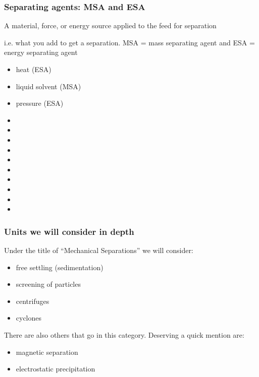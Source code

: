 \begin{frame}\frametitle{Separating agents: MSA and ESA}	
	\begin{exampleblock}
		{A material, force, or energy source applied to the feed for separation }
	\end{exampleblock}
	\vspace{12pt}
	i.e. what you add to get a separation. MSA = mass separating agent and ESA = energy separating agent
	\vspace{12pt}
	
	\begin{itemize}
		\item	heat (ESA)
		\item	liquid solvent (MSA)
		\item	pressure (ESA)
		\item	\pause\iftoggle{instructor}{vacuum}{}
		\item	\iftoggle{instructor}{membrane}{}
		\item	\iftoggle{instructor}{filter media}{}
		\item	\iftoggle{instructor}{electric field}{}
		\item	\iftoggle{instructor}{flow}{}
		\item	\iftoggle{instructor}{temperature gradient}{}
		\item	\iftoggle{instructor}{concentration gradient}{}
		\item	\iftoggle{instructor}{gravitational field (natural, or artificially created)}{}
		\item	\iftoggle{instructor}{adsorbent}{}
		\item	\iftoggle{instructor}{absorbent}{}
	\end{itemize}
\end{frame}

\begin{frame}\frametitle{Units we will consider in depth}
	Under the title of ``Mechanical Separations'' we will consider:
	\begin{itemize}
		\item	free settling (sedimentation)
		\item	screening of particles 
		\item	centrifuges
		\item	cyclones
	\end{itemize}
	
	\vspace{12pt}
	There are also others that go in this category. Deserving a quick mention are:
	\begin{itemize}
		\item	magnetic separation
		\item	electrostatic precipitation
	\end{itemize}
\end{frame}

